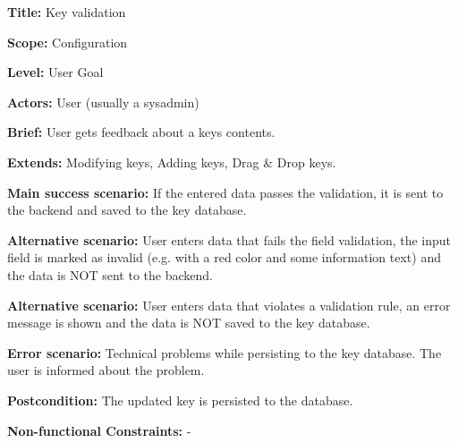 
\begin{DoxyItemize}
\item {\bfseries{Title\+:}} Key validation
\item {\bfseries{Scope\+:}} Configuration
\item {\bfseries{Level\+:}} User Goal
\item {\bfseries{Actors\+:}} User (usually a sysadmin)
\item {\bfseries{Brief\+:}} User gets feedback about a key\textquotesingle{}s contents.
\end{DoxyItemize}


\begin{DoxyItemize}
\item {\bfseries{Extends\+:}} Modifying keys, Adding keys, Drag \& Drop keys.
\item {\bfseries{Main success scenario\+:}} If the entered data passes the validation, it is sent to the backend and saved to the key database.
\item {\bfseries{Alternative scenario\+:}} User enters data that fails the field validation, the input field is marked as invalid (e.\+g. with a red color and some information text) and the data is N\+OT sent to the backend.
\item {\bfseries{Alternative scenario\+:}} User enters data that violates a validation rule, an error message is shown and the data is N\+OT saved to the key database.
\item {\bfseries{Error scenario\+:}} Technical problems while persisting to the key database. The user is informed about the problem.
\item {\bfseries{Postcondition\+:}} The updated key is persisted to the database.
\item {\bfseries{Non-\/functional Constraints\+:}} -\/ 
\end{DoxyItemize}